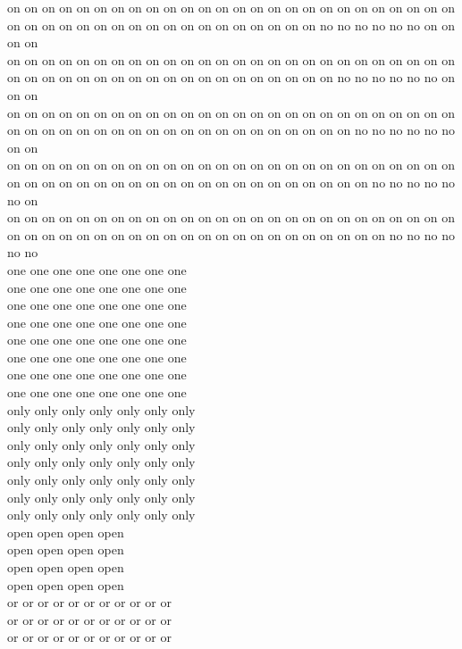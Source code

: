 on on on on on on on on on on on on on on on on on on on on on on on on on on on on on on on on on on on on on on on on on on on on no no no no no no on on on on\\
on on on on on on on on on on on on on on on on on on on on on on on on on on on on on on on on on on on on on on on on on on on on on no no no no no no on on on\\
on on on on on on on on on on on on on on on on on on on on on on on on on on on on on on on on on on on on on on on on on on on on on on no no no no no no on on\\
on on on on on on on on on on on on on on on on on on on on on on on on on on on on on on on on on on on on on on on on on on on on on on on no no no no no no on\\
on on on on on on on on on on on on on on on on on on on on on on on on on on on on on on on on on on on on on on on on on on on on on on on on no no no no no no\\
one one one one one one one one\\
one one one one one one one one\\
one one one one one one one one\\
one one one one one one one one\\
one one one one one one one one\\
one one one one one one one one\\
one one one one one one one one\\
one one one one one one one one\\
only only only only only only only\\
only only only only only only only\\
only only only only only only only\\
only only only only only only only\\
only only only only only only only\\
only only only only only only only\\
only only only only only only only\\
open open open open\\
open open open open\\
open open open open\\
open open open open\\
or or or or or or or or or or or\\
or or or or or or or or or or or\\
or or or or or or or or or or or\\
